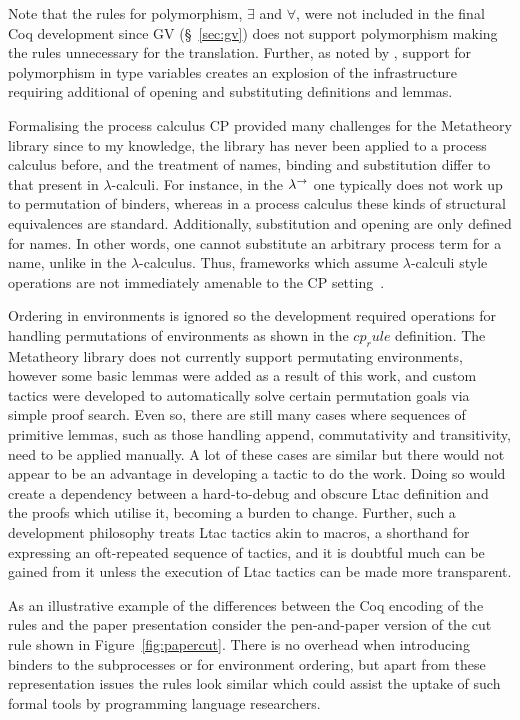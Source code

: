 Note that the rules for polymorphism, $\exists$ and $\forall$, were not
included in the final Coq development since GV (\S~\ref{sec:gv}) does not
support polymorphism making the rules unnecessary for the
translation. Further, as noted by \citeauthor{Lee:2012}, support for
polymorphism in type variables creates an explosion of the infrastructure
requiring additional of opening and substituting definitions and lemmas.

Formalising the process calculus CP provided many challenges for the
Metatheory library since to my knowledge, the library has never been applied
to a process calculus before, and the treatment of names, binding and
substitution differ to that present in $\lambda$-calculi. For instance, in the
$\lambda^\rightarrow$ one typically does not work up to permutation of binders, whereas in a
process calculus these kinds of structural equivalences are
standard. Additionally, substitution and opening are only defined for
names. In other words, one cannot substitute an arbitrary process term for a
name, unlike in the $\lambda$-calculus. Thus, frameworks which assume
$\lambda$-calculi style operations are not immediately amenable to the CP
setting~\cite{Lee:2012}.

Ordering in environments is ignored so the development required operations for
handling permutations of environments as shown in the \coqe$cp_rule$
definition. The Metatheory library does not currently support permutating
environments, however some basic lemmas were added as a result of this work,
and custom tactics were developed to automatically solve certain permutation
goals via simple proof search. Even so, there are still many cases where
sequences of primitive lemmas, such as those handling append, commutativity
and transitivity, need to be applied manually. A lot of these cases are
similar but there would not appear to be an advantage in developing a tactic
to do the work. Doing so would create a dependency between a hard-to-debug and
obscure Ltac definition and the proofs which utilise it, becoming a burden to
change. Further, such a development philosophy treats Ltac tactics akin to
macros, a shorthand for expressing an oft-repeated sequence of tactics, and it
is doubtful much can be gained from it unless the execution of Ltac tactics
can be made more transparent.

As an illustrative example of the differences between the Coq encoding of the
rules and the paper presentation consider the pen-and-paper version of the cut
rule shown in Figure~\ref{fig:papercut}. There is no overhead when introducing
binders to the subprocesses or for environment ordering, but apart from these
representation issues the rules look similar which could assist the uptake of
such formal tools by programming language researchers.

